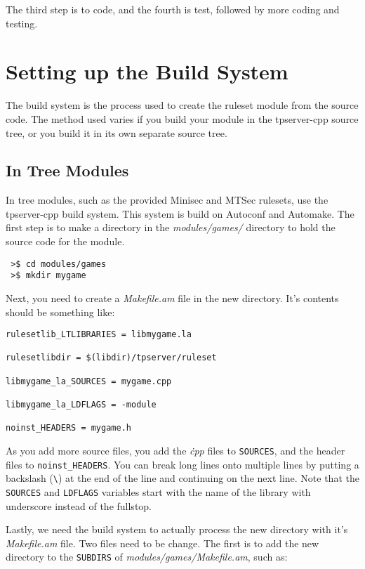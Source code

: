 \documentclass[a4paper,11pt]{report}
\newcommand{\filename}[1]{\emph{#1}}
\newcommand{\codename}[1]{\texttt{#1}}
\begin{document}
The third step is to code, and the fourth is test, followed by more coding and testing.


\chapter{Setting up the Build System}
\label{chap:build-system}

The build system is the process used to create the ruleset module from the source code. The method used varies if you build your module in the tpserver-cpp source tree, or you build it in its own separate source tree.



\section{In Tree Modules}
\label{sec:intree-module-build}

In tree modules, such as the provided Minisec and MTSec rulesets, use the tpserver-cpp build system. This system is build on Autoconf and Automake.  The first step is to make a directory in the \filename{modules/games/} directory to hold the source code for the module. 

\begin{verbatim}
 >$ cd modules/games
 >$ mkdir mygame
\end{verbatim}

Next, you need to create a \filename{Makefile.am} file in the new directory. It's contents should be something like:

\begin{verbatim}
rulesetlib_LTLIBRARIES = libmygame.la

rulesetlibdir = $(libdir)/tpserver/ruleset

libmygame_la_SOURCES = mygame.cpp

libmygame_la_LDFLAGS = -module

noinst_HEADERS = mygame.h
\end{verbatim}

As you add more source files, you add the \filename{\.cpp} files to \codename{SOURCES}, and the header files to \codename{noinst\_HEADERS}. You can break long lines onto multiple lines by putting a backslash (\verb|\|) at the end of the line and continuing on the next line. Note that the \codename{SOURCES} and \codename{LDFLAGS} variables start with the name of the library with underscore instead of the fullstop.

Lastly, we need the build system to actually process the new directory with it's \filename{Makefile.am} file. Two files need to be change. The first is to add the new directory to the \codename{SUBDIRS} of \filename{modules/games/Makefile.am}, such as:
\end{document}
